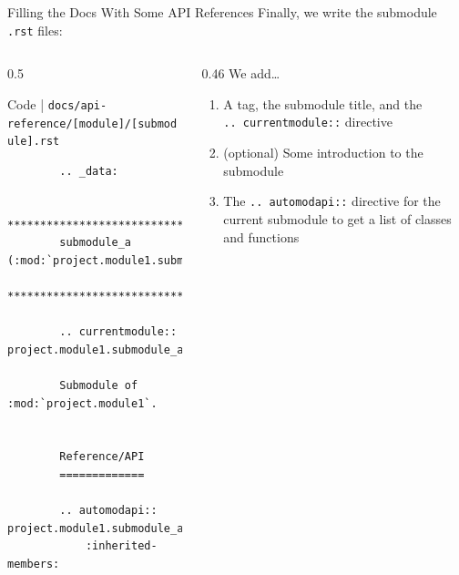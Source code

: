 \begin{frame}[fragile]{Filling the Docs With Some API References}
  Finally, we write the submodule \texttt{.rst} files:

  \begin{columns}[onlytextwidth]
    \begin{column}{0.5\textwidth}
      \begin{block}{Code | \texttt{docs/api-reference/[module]/[submodule].rst}}
      \footnotesize
      \begin{verbatim}
        .. _data:

        ************************************************
        submodule_a (:mod:`project.module1.submodule_a`)
        ************************************************

        .. currentmodule:: project.module1.submodule_a

        Submodule of :mod:`project.module1`.


        Reference/API
        =============

        .. automodapi:: project.module1.submodule_a
            :inherited-members:
      \end{verbatim}
      \end{block}
    \end{column}
    \hfill
    \begin{column}{0.46\textwidth}
      We add\dots
      \begin{enumerate}
        \setlength{\itemsep}{1.5em}
        \item A tag, the submodule title, and the\\\texttt{.. currentmodule::} directive
        \item (optional) Some introduction to the submodule
        \item The \texttt{.. automodapi::} directive for the current submodule to get a list of
          classes and functions
      \end{enumerate}
    \end{column}
  \end{columns}
\end{frame}

